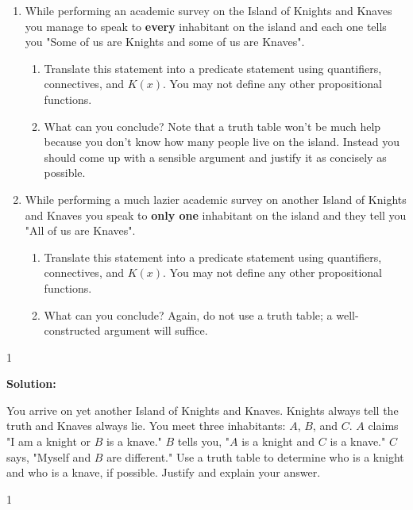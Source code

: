\documentclass[9pt]{article}
\def\solutions{1}
\newcommand{\ben}{\begin{enumerate}}
\newcommand{\een}{\end{enumerate}}
\begin{document}
\ben
\item While performing an academic survey on the Island of Knights and Knaves you manage to speak to \textbf{every} inhabitant on the island and each one tells you "Some of us are Knights and some of us are Knaves".
\ben
\item Translate this statement into a predicate statement using quantifiers, connectives, and $K(x)$. You may not define any other propositional functions.
\item What can you conclude? Note that a truth table won't be much help because you don't know how many people live on the island. Instead you should come up with a sensible argument and justify it as concisely as possible.
\een
\item While performing a much lazier academic survey on another Island of Knights and Knaves you speak to \textbf{only one} inhabitant on the island and they tell you "All of us are Knaves".
\ben
\item Translate this statement into a predicate statement using quantifiers, connectives, and $K(x)$. You may not define any other propositional functions.
\item What can you conclude? Again, do not use a truth table; a well-constructed argument will suffice.
\een
\een


  \if\solutions1
  \vspace{2mm}
  
  \textbf{Solution:}   \\

  \fi

\vspace{5mm}

\vspace{5mm}

\item You arrive on yet another Island of Knights and Knaves. Knights always tell the truth and Knaves always lie. You meet three inhabitants: $A$, $B$, and $C$. $A$ claims "I am a knight or $B$ is a knave." $B$ tells you, "$A$ is a knight and $C$ is a knave." $C$ says, "Myself and $B$ are different." Use a truth table to determine who is a knight and who is a knave, if possible. Justify and explain your answer.



\if\solutions1
\vspace{2mm}
  
\end{document}
